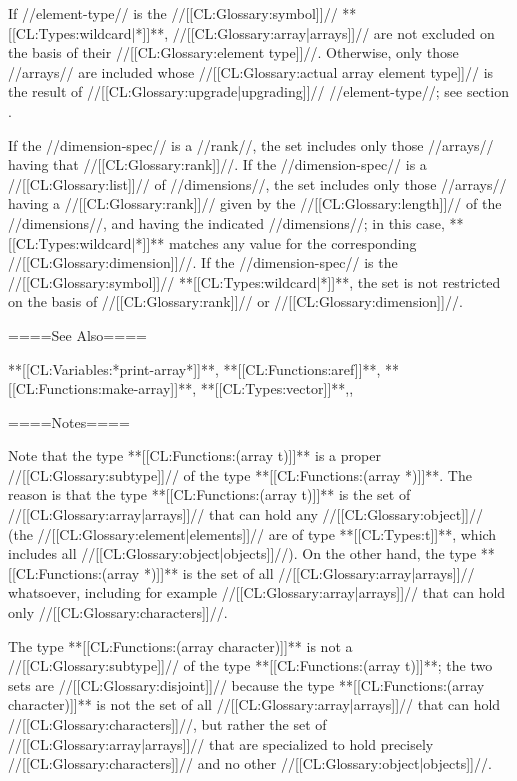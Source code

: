 If //element-type// is the //[[CL:Glossary:symbol]]// **[[CL:Types:wildcard|*]]**, //[[CL:Glossary:array|arrays]]// are not excluded on the basis of their //[[CL:Glossary:element type]]//. Otherwise, only those //arrays// are included whose //[[CL:Glossary:actual array element type]]// is the result of //[[CL:Glossary:upgrade|upgrading]]// //element-type//; see section {\secref\ArrayUpgrading}.

If the //dimension-spec// is a //rank//, the set includes only those //arrays// having that //[[CL:Glossary:rank]]//. If the //dimension-spec// is a //[[CL:Glossary:list]]// of //dimensions//, the set includes only those //arrays// having a //[[CL:Glossary:rank]]// given by the //[[CL:Glossary:length]]// of the //dimensions//, and having the indicated //dimensions//; in this case, **[[CL:Types:wildcard|*]]** matches any value for the corresponding //[[CL:Glossary:dimension]]//. If the //dimension-spec// is the //[[CL:Glossary:symbol]]// **[[CL:Types:wildcard|*]]**, the set is not restricted on the basis of //[[CL:Glossary:rank]]// or //[[CL:Glossary:dimension]]//.

====See Also====

**[[CL:Variables:*print-array*]]**, **[[CL:Functions:aref]]**, **[[CL:Functions:make-array]]**, **[[CL:Types:vector]]**,{\secref\SharpsignA}, {\secref\PrintingOtherArrays}

====Notes====

Note that the type **[[CL:Functions:(array t)]]** is a proper //[[CL:Glossary:subtype]]// of the type **[[CL:Functions:(array *)]]**. The reason is that the type **[[CL:Functions:(array t)]]** is the set of //[[CL:Glossary:array|arrays]]// that can hold any //[[CL:Glossary:object]]// (the //[[CL:Glossary:element|elements]]// are of type **[[CL:Types:t]]**, which includes all //[[CL:Glossary:object|objects]]//). On the other hand, the type **[[CL:Functions:(array *)]]** is the set of all //[[CL:Glossary:array|arrays]]// whatsoever, including for example //[[CL:Glossary:array|arrays]]// that can hold only //[[CL:Glossary:characters]]//.

The type **[[CL:Functions:(array character)]]** is not a //[[CL:Glossary:subtype]]// of the type **[[CL:Functions:(array t)]]**; the two sets are //[[CL:Glossary:disjoint]]// because the type **[[CL:Functions:(array character)]]** is not the set of all //[[CL:Glossary:array|arrays]]// that can hold //[[CL:Glossary:characters]]//, but rather the set of //[[CL:Glossary:array|arrays]]// that are specialized to hold precisely //[[CL:Glossary:characters]]// and no other //[[CL:Glossary:object|objects]]//.

